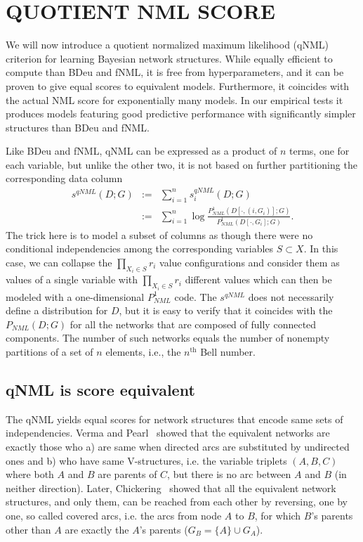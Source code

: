 \section{QUOTIENT NML SCORE}

We will now introduce a quotient normalized maximum likelihood (qNML)
criterion for learning Bayesian network structures.  While equally
efficient to compute than BDeu and fNML, it is free from
hyperparameters, and it can be proven to give equal scores to
equivalent models. Furthermore, it coincides with the actual NML score
for exponentially many models. In our empirical tests it produces
models featuring good predictive performance with significantly
simpler structures than BDeu and fNML.

Like BDeu and fNML, qNML can be expressed as a product of $n$ terms,
one for each variable, but unlike the other two, it is not based on
further partitioning the corresponding data column
\begin{eqnarray}
\label{eqn:qnmldef}
s^{qNML}(D;G) & := & \sum_{i=1}^n s^{qNML}_i(D;G)\\
& := & \sum_{i=1}^n \log \frac{P^1_{NML}(D[\cdot,(i,G_i)];G)}
                             {P^1_{NML}(D[\cdot,G_i];G)}.\nonumber
\end{eqnarray}
The trick here is to model a subset of columns as though there were no
conditional independencies among the corresponding variables $S
\subset X$.  In this case, we can collapse the $\prod_{X_i\in S} r_i$
value configurations and consider them as values of a single variable
with $\prod_{X_i\in S} r_i$ different values which can then be modeled
with a one-dimensional $P^1_{NML}$ code.  The $s^{qNML}$ does not
necessarily define a distribution for $D$, but it is easy to verify
that it coincides with the $P_{NML}(D;G)$ for all the networks that
are composed of fully connected components.  The number of such
networks equals the number of nonempty partitions of a set of $n$
elements, i.e., the $n^\text{th}$ Bell number.

\subsection {qNML is score equivalent}

The qNML yields equal scores for network structures that encode same
sets of independencies. Verma and Pearl~\cite{Verm90} showed that the
equivalent networks are exactly those who a) are same when directed
arcs are substituted by undirected ones and b) who have same
V-structures, i.e.  the variable triplets $(A,B,C)$ where both $A$ and
$B$ are parents of $C$, but there is no arc between $A$ and $B$ (in
neither direction).  Later, Chickering~\cite{Chick95} showed that all
the equivalent network structures, and only them, can be reached from
each other by reversing, one by one, so called covered arcs, i.e. the
arcs from node $A$ to $B$, for which $B$'s parents other than $A$ are
exactly the $A$'s parents ($G_B=\{A\}\cup G_A$).

